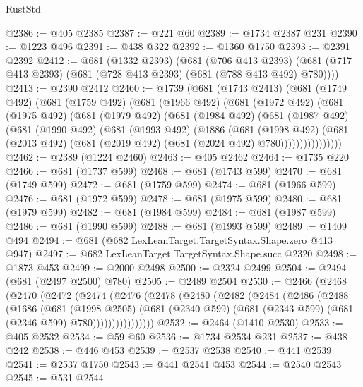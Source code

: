 \begin{lexlean}{RustStd}
\begin{coremodule}
{\begin{coremodule}
{{{{{{{{{{{{{{{{{{{{{{{{{@2386 := @405 @2385
@2387 := @221 @60
@2389 := @1734 @2387 @231
@2390 := @1223 @496
@2391 := @438 @322
@2392 := @1360 @1750
@2393 := @2391 @2392
@2412 := @681
    (@1332 @2393)
    (@681
      (@706 @413 @2393)
      (@681 (@717 @413 @2393) (@681 (@728 @413 @2393) (@681 (@788 @413 @492) @780))))
@2413 := @2390 @2412
@2460 := @1739
    (@681
      (@1743 @2413)
      (@681
        (@1749 @492)
        (@681
          (@1759 @492)
          (@681
            (@1966 @492)
            (@681
              (@1972 @492)
              (@681
                (@1975 @492)
                (@681
                  (@1979 @492)
                  (@681
                    (@1984 @492)
                    (@681
                      (@1987 @492)
                      (@681
                        (@1990 @492)
                        (@681
                          (@1993 @492)
                          (@1886
                            (@681
                              (@1998 @492)
                              (@681
                                (@2013 @492)
                                (@681 (@2019 @492) (@681 (@2024 @492) @780))))))))))))))))
@2462 := @2389 (@1224 @2460)
@2463 := @405 @2462
@2464 := @1735 @220
@2466 := @681 (@1737 @599)
@2468 := @681 (@1743 @599)
@2470 := @681 (@1749 @599)
@2472 := @681 (@1759 @599)
@2474 := @681 (@1966 @599)
@2476 := @681 (@1972 @599)
@2478 := @681 (@1975 @599)
@2480 := @681 (@1979 @599)
@2482 := @681 (@1984 @599)
@2484 := @681 (@1987 @599)
@2486 := @681 (@1990 @599)
@2488 := @681 (@1993 @599)
@2489 := @1409 @494
@2494 := @681 (@682 LexLeanTarget.TargetSyntax.Shape.zero @413 @947)
@2497 := @682 LexLeanTarget.TargetSyntax.Shape.succ @2320
@2498 := @1873 @453
@2499 := @2000 @2498
@2500 := @2324 @2499
@2504 := @2494 (@681 (@2497 @2500) @780)
@2505 := @2489 @2504
@2530 := @2466
    (@2468
      (@2470
        (@2472
          (@2474
            (@2476
              (@2478
                (@2480
                  (@2482
                    (@2484
                      (@2486
                        (@2488
                          (@1686
                            (@681
                              (@1998 @2505)
                              (@681
                                (@2340 @599)
                                (@681 (@2343 @599) (@681 (@2346 @599) @780))))))))))))))))
@2532 := @2464 (@1410 @2530)
@2533 := @405 @2532
@2534 := @59 @60
@2536 := @1734 @2534 @231
@2537 := @438 @242
@2538 := @446 @453
@2539 := @2537 @2538
@2540 := @441 @2539
@2541 := @2537 @1750
@2543 := @441 @2541 @453
@2544 := @2540 @2543
@2545 := @531 @2544
}}}}}}}}}}}}}}}}}}}}}}}}}
\end{coremodule}}
\end{coremodule}
\end{lexlean}
